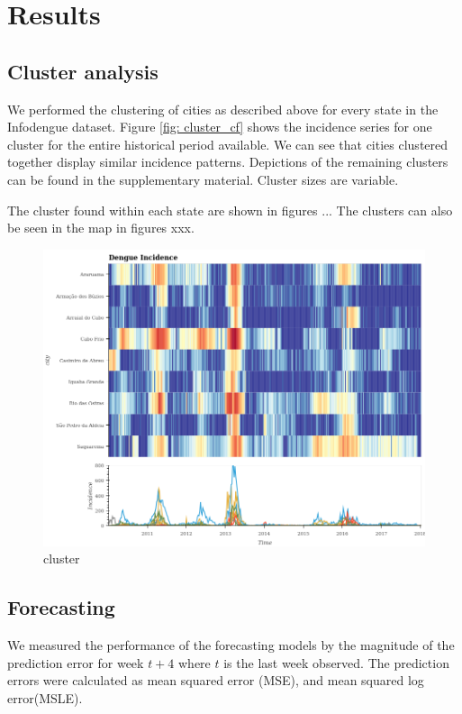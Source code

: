 \documentclass[12pt]{report}
\begin{document}
\section{Results}

\subsection{Cluster analysis}

We performed the clustering of cities as described above for every state in the Infodengue dataset. Figure \ref{fig: cluster_cf} shows the incidence series for one cluster for the entire historical period available. We can see that cities clustered together display similar incidence patterns. Depictions of the remaining clusters can be found in the supplementary material. Cluster sizes are variable.


The cluster found within each state are shown in figures ... The clusters can 
also be seen in the map in figures xxx.
\begin{figure}[h]
 \centering
 \includegraphics[scale=0.4]{./cluster_3300209.png}
 \caption{cluster}
\end{figure}

\subsection{Forecasting}
We measured the performance of the forecasting models by the magnitude of the prediction error for week $t+4$ where $t$ is the last week observed. The prediction errors were calculated as mean squared error (MSE), and mean squared log error(MSLE).
\end{document}
